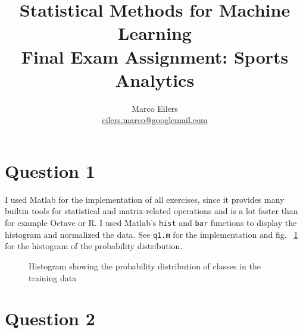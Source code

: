 \documentclass{article}
\author{Marco Eilers\\ \url{eilers.marco@googlemail.com}}
\title{Statistical Methods for Machine Learning\\ Final Exam Assignment: Sports Analytics}
\date{}
\begin{document}
\maketitle

\section{Question 1}
I used Matlab for the implementation of all exercises, since it provides many builtin tools for statistical and matrix-related operations and is a lot faster than for example Octave or R. I used Matlab's \texttt{hist} and \texttt{bar} functions to display the histogram and normalized the data. See \texttt{q1.m} for the implementation and fig. ~\ref{fig:probdisthist} for the histogram of the probability distribution. 

\begin{figure}
  \centering

  \caption{Histogram showing the probability distribution of classes in the training data}
  \label{fig:probdisthist}
\end{figure}

\section{Question 2}
\end{document}
